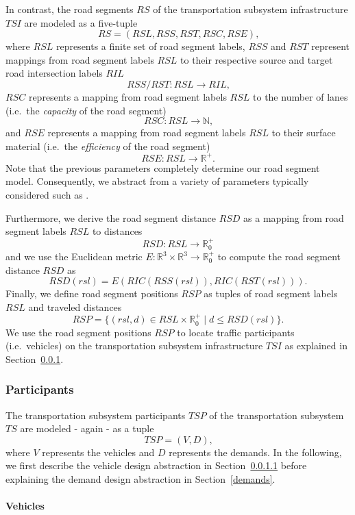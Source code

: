 In contrast, the road segments $RS$ of the transportation subsystem infrastructure $TSI$ are modeled as a five-tuple
\[
	RS = (RSL, RSS, RST, RSC, RSE) \textrm{,}
\]
where $RSL$ represents a finite set of road segment labels, $RSS$ and $RST$ represent mappings from road segment labels $RSL$ to their respective source and target road intersection labels $RIL$
\[
	RSS/RST: RSL \rightarrow RIL \textrm{,}
\]
$RSC$ represents a mapping from road segment labels $RSL$ to the number of lanes (i.e.\ the \textit{capacity} of the road segment)
\[
	RSC: RSL \rightarrow \mathbb{N} \textrm{,}
\]
and $RSE$ represents a mapping from road segment labels $RSL$ to their surface material (i.e.\ the \textit{efficiency} of the road segment)
\[
	RSE: RSL \rightarrow \mathbb{R}^+ \textrm{.}
\]
Note that the previous parameters completely determine our road segment model. Consequently, we abstract from a variety of parameters typically considered such as .

Furthermore, we derive the road segment distance $RSD$ as a mapping from road segment labels $RSL$ to distances
\[
	RSD: RSL \rightarrow \mathbb{R}_0^+
\]
and we use the Euclidean metric $E: \mathbb{R}^3 \times \mathbb{R}^3 \rightarrow \mathbb{R}_0^+$ to compute the road segment distance $RSD$ as
\[
	RSD(rsl) = E(RIC(RSS(rsl)), RIC(RST(rsl))) \textrm{.}
\]
Finally, we define road segment positions $RSP$ as tuples of road segment labels $RSL$ and traveled distances
\[
	RSP = \{(rsl, d) \in RSL \times \mathbb{R}_0^+ \mid d \leq RSD(rsl)\} \textrm{.}
\]
We use the road segment positions $RSP$ to locate traffic participants (i.e.\ vehicles) on the transportation subsystem infrastructure $TSI$ as explained in Section~\ref{participants}.

\subsubsection{Participants}
\label{participants}

The transportation subsystem participants $TSP$ of the transportation subsystem $TS$ are modeled - again - as a tuple
\[
	TSP = (V, D) \textrm{,}
\]
where $V$ represents the vehicles and $D$ represents the demands. In the following, we first describe the vehicle design abstraction in Section~\ref{vehicles} before explaining the demand design abstraction in Section~\ref{demands}.

\paragraph{Vehicles}
\label{vehicles}

